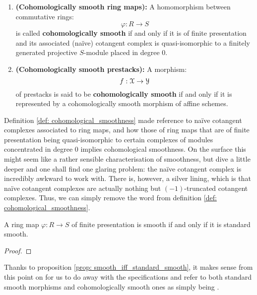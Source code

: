             \begin{definition} \label{def: cohomological_smoothness} 
                \noindent
                \begin{enumerate}
                    \item \textbf{(Cohomologically smooth ring maps):} A homomorphism between commutative rings:
                        $$\varphi: R \to S$$
                    is called \textbf{cohomologically smooth} if and only if it is of finite presentation and its associated (na\"ive) cotangent complex is quasi-isomorphic to a finitely generated projective $S$-module placed in degree $0$.
                    \item \textbf{(Cohomologically smooth prestacks):} A morphism:
                        $$f: \mathcal{X} \to \mathcal{Y}$$
                    of prestacks is said to be \textbf{cohomologically smooth} if and only if it is represented by a cohomologically smooth morphism of affine schemes.
                \end{enumerate}
            \end{definition}
            \begin{remark}
                Definition \ref{def: cohomological_smoothness} made reference to na\"ive cotangent complexes associated to ring maps, and how those of ring maps that are of finite presentation being quasi-isomorphic to certain complexes of modules concentrated in degree $0$ implies cohomological smoothness. On the surface this might seem like a rather sensible characterisation of smoothness, but dive a little deeper and one shall find one glaring problem: the na\"ive cotangent complex is incredibly awkward to work with. There is, however, a silver lining, which is that na\"ive cotangent complexes are actually nothing but $(-1)$-truncated cotangent complexes. Thus, we can simply remove the word  from definition \ref{def: cohomological_smoothness}. 
            \end{remark}
            
            \begin{proposition} \label{prop: smooth_iff_standard_smooth}
                A ring map $\varphi: R \to S$ of finite presentation is smooth if and only if it is standard smooth.
            \end{proposition}
                \begin{proof}
                
                \end{proof} 
            \begin{convention}
                Thanks to proposition \ref{prop: smooth_iff_standard_smooth}, it makes sense from this point on for us to do away with the specifications and refer to both standard smooth morphisms and cohomologically smooth ones as simply being .
            \end{convention}
                
